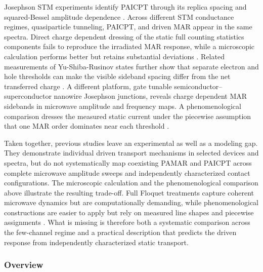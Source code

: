     Josephson STM experiments identify PAICPT through its replica spacing and squared-Bessel amplitude dependence \cite{roychowdhury_microwave_2015}. Across different STM conductance regimes, quasiparticle tunneling, PAICPT, and driven MAR appear in the same spectra. Direct charge dependent dressing of the static full counting statistics components fails to reproduce the irradiated MAR response, while a microscopic calculation performs better but retains substantial deviations \cite{kot_microwave-assisted_2020}. Related measurements of Yu-Shiba-Rusinov states further show that separate electron and hole thresholds can make the visible sideband spacing differ from the net transferred charge \cite{peters_resonant_2020}. A different platform, gate tunable semiconductor--superconductor nanowire Josephson junctions, reveals charge dependent MAR sidebands in microwave amplitude and frequency maps. A phenomenological comparison dresses the measured static current under the piecewise assumption that one MAR order dominates near each threshold \cite{carrad_photon-assisted_2022}.

    Taken together, previous studies leave an experimental as well as a modeling gap. They demonstrate individual driven transport mechanisms in selected devices and spectra, but do not systematically map coexisting PAMAR and PAICPT across complete microwave amplitude sweeps and independently characterized contact configurations. The microscopic calculation and the phenomenological comparison above illustrate the resulting trade-off. Full Floquet treatments capture coherent microwave dynamics but are computationally demanding, while phenomenological constructions are easier to apply but rely on measured line shapes and piecewise assignments \cite{kot_microwave-assisted_2020,carrad_photon-assisted_2022}. What is missing is therefore both a systematic comparison across the few-channel regime and a practical description that predicts the driven response from independently characterized static transport.

    \subsubsection*{Overview}

